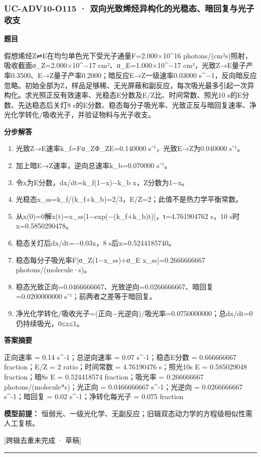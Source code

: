 \documentclass[UTF8,11pt,a4paper]{ctexart}
\begin{document}
\subsubsection*{UC-ADV10-O115 · 双向光致烯烃异构化的光稳态、暗回复与光子收支}
\noindent\textbf{题目}\par
假想烯烃Z⇌E在均匀单色光下受光子通量F=2.000×10\textasciicircum{}16 photons/(cm²s)照射，吸收截面σ\_Z=2.000×10\textasciicircum{}−17 cm²、σ\_E=1.000×10\textasciicircum{}−17 cm²，光致Z→E量子产率0.3500、E→Z量子产率0.2000；暗反应E→Z一级速率0.03000 s\textasciicircum{}−1，反向暗反应忽略。初始全部为Z，样品足够稀、无光屏蔽和副反应，每次吸光最多引起一次异构化。求光照正反有效速率、光稳态E分数及E/Z比、时间常数、照光10 s的E分数、先达稳态后关灯8 s的E分数、稳态每分子吸光率、光致正反与暗回复速率、净光化学转化/吸收光子，并验证物料与光子收支。\par
\medskip\noindent\textbf{分步解答}
\begin{enumerate}
\item 光致Z→E速率k\_f=Fσ\_ZΦ\_ZE=0.140000 s⁻¹，光致E→Z为0.040000 s⁻¹。
\item 加上暗E→Z速率，逆向总速率k\_b=0.070000 s⁻¹。
\item 令x为E分数，dx/dt=k\_f(1−x)−k\_b x，Z分数为1−x。
\item 光稳态x\_ss=k\_f/(k\_f+k\_b)=2/3，E/Z=2；此值不是热力学平衡常数。
\item 从x(0)=0解x(t)=x\_ss[1−exp(−(k\_f+k\_b)t)]，τ=4.761904762 s，10 s时x=0.5850290478。
\item 稳态关灯后dx/dt=−0.03x，8 s后x=0.5244185740。
\item 稳态每分子吸光率F[σ\_Z(1−x\_ss)+σ\_E x\_ss]=0.2666666667 photons/(molecule·s)。
\item 稳态光致正向=0.0466666667、光致逆向=0.0266666667、暗回复=0.0200000000 s⁻¹；前两者之差等于暗回复。
\item 净光化学转化/吸收光子=(正向−光逆向)/吸光率=0.0750000000；总dx/dt=0仍持续吸光，0≤x≤1。
\end{enumerate}
\noindent\textbf{答案摘要}\par
正向速率 = 0.14 s\textasciicircum{}-1；总逆向速率 = 0.07 s\textasciicircum{}-1；稳态E分数 = 0.666666667 fraction；E/Z = 2 ratio；时间常数 = 4.76190476 s；照光10s E = 0.585029048 fraction；暗8s E = 0.524418574 fraction；吸光率 = 0.266666667 photons/(molecule*s)；光正向 = 0.0466666667 s\textasciicircum{}-1；光逆向 = 0.0266666667 s\textasciicircum{}-1；暗回复 = 0.02 s\textasciicircum{}-1；净转化每光子 = 0.075 fraction\par
\noindent\textbf{模型前提：}
恒弱光、一级光化学、无副反应；旧辑双态动力学的方程级相似性需人工复核。\par
\noindent\textcolor{red!65!black}{[跨辑去重未完成 · 草稿]} \par
\medskip\hrule\medskip
{}
\end{document}
